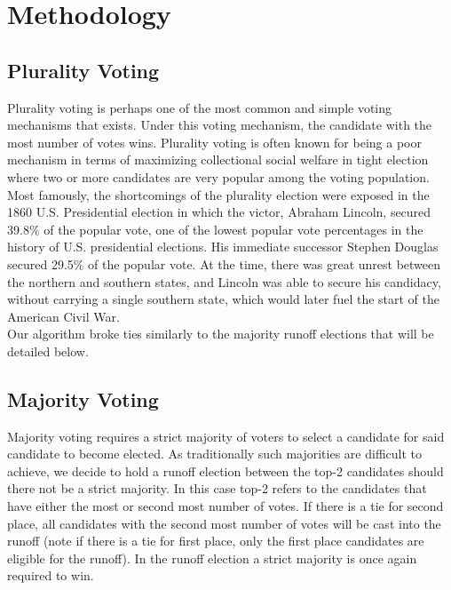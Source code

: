 \documentclass[11pt]{scrartcl}
\begin{document}
\vspace{2mm}

\section{Methodology}

\subsection{Plurality Voting}

Plurality voting is perhaps one of the most common and simple voting mechanisms that exists. Under this voting mechanism, the candidate with the most number of votes wins. Plurality voting is often known for being a poor mechanism in terms of maximizing collectional social welfare in tight election where two or more candidates are very popular among the voting population. Most famously, the shortcomings of the plurality election were exposed in the 1860 U.S. Presidential election in which the victor, Abraham Lincoln, secured 39.8\% of the popular vote, one of the lowest popular vote percentages in the history of U.S. presidential elections. His immediate successor Stephen Douglas secured 29.5\% of the popular vote. At the time, there was great unrest between the northern and southern states, and Lincoln was able to secure his candidacy, without carrying a single southern state, which would later fuel the start of the American Civil War.\\

Our algorithm broke ties similarly to the majority runoff elections that will be detailed below.

\subsection{Majority Voting}

Majority voting requires a strict majority of voters to select a candidate for said candidate to become elected. As traditionally such majorities are difficult to achieve, we decide to hold a runoff election between the top-2 candidates should there not be a strict majority. In this case top-2 refers to the candidates that have either the most or second most number of votes. If there is a tie for second place, all candidates with the second most number of votes will be cast into the runoff (note if there is a tie for first place, only the first place candidates are eligible for the runoff). In the runoff election a strict majority is once again required to win.\\
\end{document}
